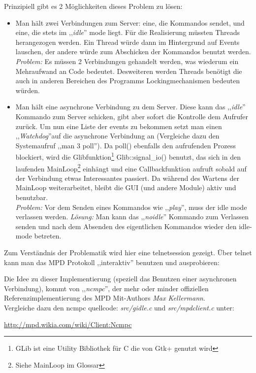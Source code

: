 Prinzipiell gibt es 2 Möglichkeiten dieses Problem zu lösen:
\begin{itemize}
    \item Man hält zwei Verbindungen zum Server: eine, die Kommandos sendet, und eine, die stets im ,,\textit{idle}'' mode liegt.
        Für die Realisierung müssten Threads herangezogen werden. Ein Thread würde dann im Hintergrund auf Events lauschen,
        der andere würde zum Abschicken der Kommandos benutzt werden.
        \emph{Problem:} Es müssen 2 Verbindungen gehandelt werden, was wiederum ein Mehraufwand an Code bedeutet.
        Desweiteren werden Threads benötigt die auch in anderen Bereichen des Programms Lockingmechanismen bedeuten würden.
    \item Man hält eine asynchrone Verbindung zu dem Server.
        Diese kann das ,,\textit{idle}'' Kommando zum Server schicken, gibt aber sofort die Kontrolle dem Aufrufer zurück. Um nun eine Liste der events zu bekommen setzt man 
        einen ,,\textit{Watchdog}''auf die asynchrone Verbindung an (Vergleiche dazu den Systemaufruf ,,man 3 poll'').
        Da poll() ebenfalls den aufrufenden Prozess blockiert, wird die Glibfunktion\footnote{GLib ist eine Utility Bibliothek für C die von Gtk+ genutzt wird} Glib::signal\_io() benutzt, das sich in den laufenden MainLoop\footnote{Siehe MainLoop im Glossar} einhängt und eine 
        Callbackfunktion aufruft sobald auf der Verbindung etwas Interessantes passiert. Da während des Wartens der MainLoop
        weiterarbeitet, bleibt die GUI (und andere Module) aktiv und benutzbar.
        \\
        \emph{Problem:} Vor dem Senden eines Kommandos wie ,,\textit{play}'', muss der idle mode verlassen werden.
        \emph{Lösung:} Man kann das ,,\textit{noidle}'' Kommando zum Verlassen senden und nach dem Absenden des eigentlichen Kommandos wieder den idle-mode betreten.
\end{itemize}

Zum Verständnis der Problematik wird hier eine telnetsession gezeigt. 
Über telnet kann man das MPD Protokoll ,,interaktiv'' benutzen und ausprobieren: 


Die Idee zu dieser Implementierung (speziell das Benutzen einer asynchronen Verbindung), kommt von ,,\textit{ncmpc}'',
der mehr oder minder offiziellen Referenzimplementierung des MPD Mit-Authors \emph{Max Kellermann}.\\
Vergleiche dazu den ncmpc quellcode: \textit{src/gidle.c} und \textit{src/mpdclient.c} unter:
\begin{center}
\url{http://mpd.wikia.com/wiki/Client:Ncmpc}
\end{center}




